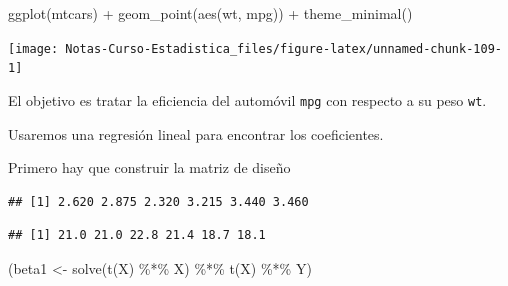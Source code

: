 \documentclass[
  12pt,
]{book}
\newenvironment{Shaded}{\begin{snugshade}}{\end{snugshade}}
\newcommand{\FunctionTok}[1]{\textcolor[rgb]{0.00,0.00,0.00}{#1}}
\newcommand{\NormalTok}[1]{#1}
\newcommand{\OtherTok}[1]{\textcolor[rgb]{0.56,0.35,0.01}{#1}}
\newcommand{\SpecialCharTok}[1]{\textcolor[rgb]{0.00,0.00,0.00}{#1}}
\theoremstyle{definition}
\theoremstyle{definition}
\theoremstyle{definition}
\theoremstyle{definition}
\theoremstyle{remark}
\begin{document}
\begin{Shaded}
\begin{Highlighting}[]
\FunctionTok{ggplot}\NormalTok{(mtcars) }\SpecialCharTok{+} \FunctionTok{geom\_point}\NormalTok{(}\FunctionTok{aes}\NormalTok{(wt, mpg)) }\SpecialCharTok{+} \FunctionTok{theme\_minimal}\NormalTok{()}
\end{Highlighting}
\end{Shaded}

\begin{center}\texttt{[image: Notas-Curso-Estadistica\_files/figure-latex/unnamed-chunk-109-1]} \end{center}

El objetivo es tratar la eficiencia del automóvil \texttt{mpg} con respecto a su peso \texttt{wt}.

Usaremos una regresión lineal para encontrar los coeficientes.

Primero hay que construir la matriz de diseño

\begin{Shaded}
\end{Shaded}

\begin{verbatim}
## [1] 2.620 2.875 2.320 3.215 3.440 3.460
\end{verbatim}

\begin{Shaded}
\end{Shaded}

\begin{verbatim}
## [1] 21.0 21.0 22.8 21.4 18.7 18.1
\end{verbatim}

\begin{Shaded}
\begin{Highlighting}[]
\NormalTok{(beta1 }\OtherTok{\textless{}{-}} \FunctionTok{solve}\NormalTok{(}\FunctionTok{t}\NormalTok{(X) }\SpecialCharTok{\%*\%}\NormalTok{ X) }\SpecialCharTok{\%*\%} \FunctionTok{t}\NormalTok{(X) }\SpecialCharTok{\%*\%}\NormalTok{ Y)}
\end{Highlighting}
\end{Shaded}
\end{document}
